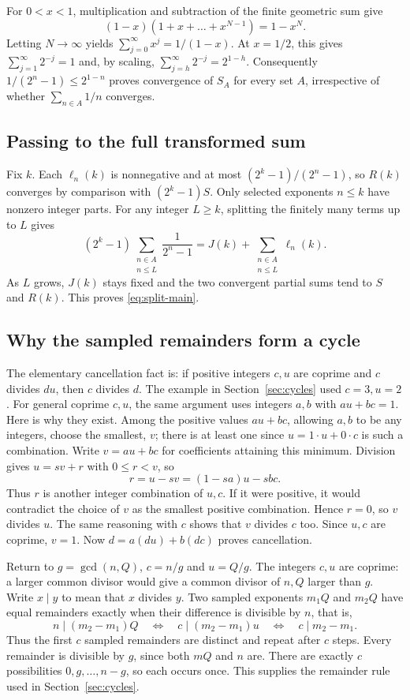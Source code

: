 \documentclass[10pt]{article}
\theoremstyle{plain}
\theoremstyle{definition}
\theoremstyle{remark}
\newcommand{\lft}{\ell}
\begin{document}
For $0<x<1$, multiplication and subtraction of the finite geometric sum
give
\[
 (1-x)(1+x+\dots+x^{N-1})=1-x^N.
\]
Letting $N\to\infty$ yields $\sum_{j=0}^{\infty}x^j=1/(1-x)$.
At $x=1/2$, this gives $\sum_{j=1}^{\infty}2^{-j}=1$ and, by scaling,
$\sum_{j=h}^{\infty}2^{-j}=2^{1-h}$.
Consequently $1/(2^n-1)\le2^{1-n}$ proves convergence of $S_A$ for every
set $A$, irrespective of whether $\sum_{n\in A}1/n$ converges.

\subsection{Passing to the full transformed sum}\label{app:split}

Fix $k$. Each $\lft_n(k)$ is nonnegative and at most
$(2^k-1)/(2^n-1)$, so $R(k)$ converges by comparison with $(2^k-1)S$.
Only selected exponents $n\le k$ have nonzero integer parts. For any
integer $L\ge k$, splitting the finitely many terms up to $L$ gives
\[
 (2^k-1)\sum_{\substack{n\in A\\n\le L}}\frac1{2^n-1}
 =J(k)+\sum_{\substack{n\in A\\n\le L}}\lft_n(k).
\]
As $L$ grows, $J(k)$ stays fixed and the two convergent partial sums tend
to $S$ and $R(k)$. This proves \eqref{eq:split-main}.

\subsection{Why the sampled remainders form a cycle}\label{app:cycle}

The elementary cancellation fact is: if positive integers $c,u$ are
coprime and $c$ divides $du$, then $c$ divides $d$.
The example in Section~\ref{sec:cycles} used $c=3,u=2$.
For general coprime $c,u$, the same argument uses integers $a,b$ with
$au+bc=1$. Here is why they exist. Among the positive values
$au+bc$, allowing $a,b$ to be any integers, choose the smallest, $v$;
there is at least one since $u=1\cdot u+0\cdot c$ is such a combination.
Write $v=au+bc$ for coefficients attaining this minimum. Division gives
$u=sv+r$ with $0\le r<v$, so
\[
 r=u-sv=(1-sa)u-sbc.
\]
Thus $r$ is another integer combination of $u,c$. If it were positive,
it would contradict the choice of $v$ as the smallest positive combination.
Hence $r=0$, so $v$ divides $u$. The same reasoning with $c$ shows that
$v$ divides $c$ too. Since $u,c$ are coprime, $v=1$.
Now $d=a(du)+b(dc)$ proves cancellation.

Return to $g=\gcd(n,Q)$, $c=n/g$ and $u=Q/g$. The integers $c,u$ are
coprime: a larger common divisor would give a common divisor of $n,Q$
larger than $g$. Write $x\mid y$ to mean that $x$ divides $y$.
Two sampled exponents $m_1Q$ and $m_2Q$ have equal remainders exactly when
their difference is divisible by $n$, that is,
\[
 n\mid(m_2-m_1)Q
 \quad\Longleftrightarrow\quad
 c\mid(m_2-m_1)u
 \quad\Longleftrightarrow\quad
 c\mid m_2-m_1.
\]
Thus the first $c$ sampled remainders are distinct and repeat after $c$
steps. Every remainder is divisible by $g$, since both $mQ$ and $n$ are.
There are exactly $c$ possibilities $0,g,\dots,n-g$, so each occurs once.
This supplies the remainder rule used in Section~\ref{sec:cycles}.
\end{document}
